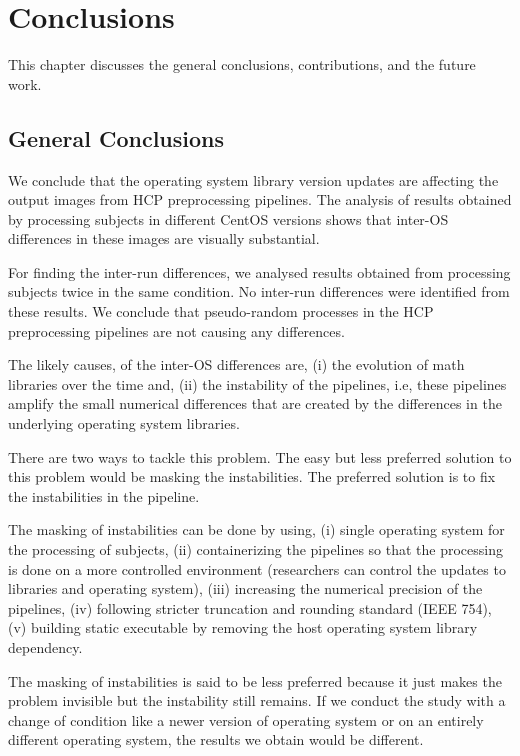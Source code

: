 \chapter{Conclusions}\label{conclusion}
This chapter discusses the general conclusions, contributions, and the future work.

\section{General Conclusions}
We conclude that the operating system library version updates are affecting 
the output images from HCP preprocessing pipelines. The analysis of results obtained by processing subjects in 
different CentOS versions shows that inter-OS differences in these 
images are visually substantial.

For finding the inter-run differences, we analysed results 
obtained from processing subjects twice in the same condition. No 
inter-run differences were identified from these results. We 
conclude that pseudo-random processes in the HCP preprocessing pipelines are not causing any differences.

The likely causes, of the inter-OS differences are, (i) the evolution 
of math libraries over the time and, (ii) the instability of the pipelines, i.e, 
these pipelines amplify the small numerical differences that are 
created by the differences in the underlying operating system 
libraries.

There are two ways to tackle this problem. The easy but less preferred 
solution to this problem would be masking the instabilities. The 
preferred solution is to fix the instabilities in the pipeline.

The masking of instabilities can be done by using, (i) single operating 
system for the processing of subjects, (ii) containerizing the 
pipelines so that the processing is done on a more controlled 
environment (researchers can control the updates to libraries and 
operating system), (iii) increasing the numerical precision of the 
pipelines, (iv) following stricter truncation and rounding standard 
(IEEE 754), (v) building static executable by removing the host 
operating system library dependency.

The masking of instabilities is said to be less preferred because it just 
makes the problem invisible but the instability still remains. If we 
conduct the study with a change of condition like a newer version of 
operating system or on an entirely different operating system, the 
results we obtain would be different.

